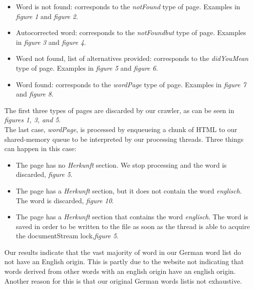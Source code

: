 \documentclass{article}
\begin{document}
\begin{itemize}
	\item Word is not found: corresponds to the \textit{notFound} type of page. Examples in \textit{figure 1} and \textit{figure 2}.\\
	\item Autocorrected word: corresponds to the \textit{notFoundbut} type of page. Examples in \textit{figure 3} and \textit{figure 4}.
	\item Word not found, list of alternatives provided: corresponds to the \textit{didYouMean} type of page. Examples in \textit{figure 5} and \textit{figure 6}.
	\item Word found: corresponds to the \textit{wordPage} type of page. Examples in \textit{figure 7} and \textit{figure 8}.
\end{itemize}

The first three types of pages are discarded by our crawler, as can be seen in \textit{figures 1, 3, and 5}.\\
The last case, \textit{wordPage}, is processed by enqueueing a chunk of HTML to our shared-memory queue to be interpreted by our processing threads.
Three things can happen in this case:
\begin{itemize}
	\item The page has no \textit{Herkunft} section. We stop processing and the word is discarded, \textit{figure 5}.
	\item The page has a \textit{Herkunft} section, but it does not contain the word \textit{englisch}. The word is discarded, \textit{figure 10}.
	\item The page has a \textit{Herkunft} section that contains the word \textit{englisch}. The word is saved in order to be written to the file as soon as the thread is able to acquire the documentStream lock,\textit{figure 5}.\\
\end{itemize}

Our results indicate that the vast majority of word in our German word list do not have an English origin. This is partly due to the website not indicating that words derived from other words with an english origin have an english origin. Another reason for this is that our original German words listis not exhaustive.
\end{document}
